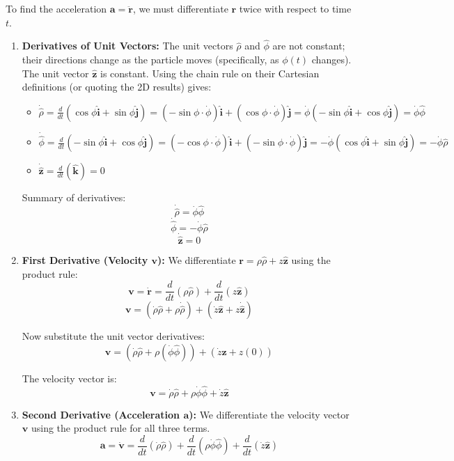 \documentclass[11pt, a4paper]{article} %
\begin{document}
To find the acceleration $\mathbf{a} = \ddot{\mathbf{r}}$, we must differentiate $\mathbf{r}$ twice with respect to time $t$.

\begin{enumerate}
    \item \textbf{Derivatives of Unit Vectors:}
    The unit vectors $\hat{\rho}$ and $\hat{\phi}$ are not constant; their directions change as the particle moves (specifically, as $\phi(t)$ changes). The unit vector $\hat{\mathbf{z}}$ is constant. Using the chain rule on their Cartesian definitions (or quoting the 2D results) gives:
    \begin{itemize}
        \item $\dot{\hat{\rho}} = \frac{d}{dt}(\cos\phi \hat{\mathbf{i}} + \sin\phi \hat{\mathbf{j}}) = (-\sin\phi \cdot \dot{\phi})\hat{\mathbf{i}} + (\cos\phi \cdot \dot{\phi})\hat{\mathbf{j}} = \dot{\phi}(-\sin\phi \hat{\mathbf{i}} + \cos\phi \hat{\mathbf{j}}) = \dot{\phi}\hat{\phi}$
        \item $\dot{\hat{\phi}} = \frac{d}{dt}(-\sin\phi \hat{\mathbf{i}} + \cos\phi \hat{\mathbf{j}}) = (-\cos\phi \cdot \dot{\phi})\hat{\mathbf{i}} + (-\sin\phi \cdot \dot{\phi})\hat{\mathbf{j}} = -\dot{\phi}(\cos\phi \hat{\mathbf{i}} + \sin\phi \hat{\mathbf{j}}) = -\dot{\phi}\hat{\rho}$
        \item $\dot{\hat{\mathbf{z}}} = \frac{d}{dt}(\hat{\mathbf{k}}) = 0$
    \end{itemize}

    Summary of derivatives:
    $$\dot{\hat{\rho}} = \dot{\phi} \hat{\phi}$$
    $$\dot{\hat{\phi}} = -\dot{\phi} \hat{\rho}$$
    $$\dot{\hat{\mathbf{z}}} = 0$$

    \item \textbf{First Derivative (Velocity $\mathbf{v}$):}
    We differentiate $\mathbf{r} = \rho \hat{\rho} + z \hat{\mathbf{z}}$ using the product rule:
    $$\mathbf{v} = \dot{\mathbf{r}} = \frac{d}{dt}(\rho \hat{\rho}) + \frac{d}{dt}(z \hat{\mathbf{z}})$$
    $$\mathbf{v} = (\dot{\rho} \hat{\rho} + \rho \dot{\hat{\rho}}) + (\dot{z} \hat{\mathbf{z}} + z \dot{\hat{\mathbf{z}}})$$
    
    Now substitute the unit vector derivatives:
    $$\mathbf{v} = (\dot{\rho} \hat{\rho} + \rho (\dot{\phi} \hat{\phi})) + (\dot{z} \hat{\mathbf{z}} + z (0))$$
    
    The velocity vector is:
    $$\mathbf{v} = \dot{\rho} \hat{\rho} + \rho \dot{\phi} \hat{\phi} + \dot{z} \hat{\mathbf{z}}$$

    \item \textbf{Second Derivative (Acceleration $\mathbf{a}$):}
    We differentiate the velocity vector $\mathbf{v}$ using the product rule for all three terms.
    $$\mathbf{a} = \dot{\mathbf{v}} = \frac{d}{dt}(\dot{\rho} \hat{\rho}) + \frac{d}{dt}(\rho \dot{\phi} \hat{\phi}) + \frac{d}{dt}(\dot{z} \hat{\mathbf{z}})$$


\end{enumerate}
\end{document}
